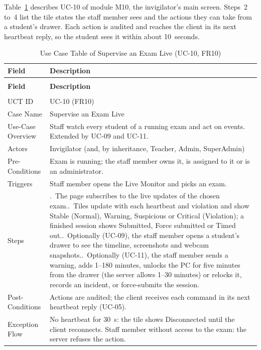 Table~\ref{tab:uct_live_proctoring} describes UC-10 of module M10, the invigilator's main screen. Steps~2 to~4 list the tile states the staff member sees and the actions they can take from a student's drawer. Each action is audited and reaches the client in its next heartbeat reply, so the student sees it within about 10~seconds.

{\renewcommand{\arraystretch}{1.1}\setlength{\tabcolsep}{6pt}
\begin{longtable}{>{\small\raggedright\arraybackslash}p{3.3cm}>{\small\raggedright\arraybackslash}p{\dimexpr\textwidth-3.3cm-4\tabcolsep\relax}}
\caption{Use Case Table of Supervise an Exam Live (UC-10, FR10)}\label{tab:uct_live_proctoring}\\ \hline\hline
\textbf{Field} & \textbf{Description} \\ \hline\hline
\endfirsthead
\multicolumn{2}{c}{\small\tablename~\thetable{} -- continued from previous page}\\ \hline\hline
\textbf{Field} & \textbf{Description} \\ \hline\hline
\endhead
\hline \multicolumn{2}{r}{\small Continued on next page}\\
\endfoot
\hline\hline
\endlastfoot
UCT ID & UC-10 (FR10) \\*
Case Name & Supervise an Exam Live \\*
Use-Case Overview & Staff watch every student of a running exam and act on events. Extended by UC-09 and UC-11. \\*
Actors & Invigilator (and, by inheritance, Teacher, Admin, SuperAdmin) \\*
Pre-Conditions & Exam is running; the staff member owns it, is assigned to it or is an administrator. \\*
Triggers & Staff member opens the Live Monitor and picks an exam. \\
Steps & 1.~The page subscribes to the live updates of the chosen exam.\newline
2.~Tiles update with each heartbeat and violation and show Stable (Normal), Warning, Suspicious or Critical (Violation); a finished session shows Submitted, Force submitted or Timed out.\newline
3.~Optionally (UC-09), the staff member opens a student's drawer to see the timeline, screenshots and webcam snapshots.\newline
4.~Optionally (UC-11), the staff member sends a warning, adds 1--180 minutes, unlocks the PC for five minutes from the drawer (the server allows 1--30 minutes) or relocks it, records an incident, or force-submits the session. \\
Post-Conditions & Actions are audited; the client receives each command in its next heartbeat reply (UC-05). \\
Exception Flow & No heartbeat for 30~s: the tile shows Disconnected until the client reconnects. Staff member without access to the exam: the server refuses the action. \\
\end{longtable}}

